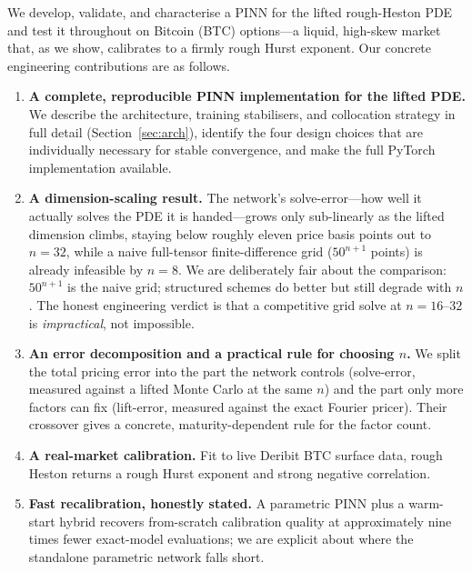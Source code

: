 \documentclass[review,12pt]{elsarticle}
\begin{document}
We develop, validate, and characterise a PINN for the lifted rough-Heston PDE and
test it throughout on Bitcoin (BTC) options---a liquid, high-skew market that, as
we show, calibrates to a firmly rough Hurst exponent.  Our concrete engineering
contributions are as follows.

\begin{enumerate}

\item \textbf{A complete, reproducible PINN implementation for the lifted PDE.}
We describe the architecture, training stabilisers, and collocation strategy in
full detail (Section~\ref{sec:arch}), identify the four design choices that are
individually necessary for stable convergence, and make the full PyTorch
implementation available.

\item \textbf{A dimension-scaling result.}  The network's solve-error---how well
it actually solves the PDE it is handed---grows only sub-linearly as the lifted
dimension climbs, staying below roughly eleven price basis points out to $n{=}32$,
while a naive full-tensor finite-difference grid ($50^{n+1}$ points) is already
infeasible by $n{=}8$.  We are deliberately fair about the comparison: $50^{n+1}$
is the naive grid; structured schemes do better but still degrade with $n$.  The
honest engineering verdict is that a competitive grid solve at $n{=}16$--$32$ is
\emph{impractical}, not impossible.

\item \textbf{An error decomposition and a practical rule for choosing $n$.}
We split the total pricing error into the part the network controls
(solve-error, measured against a lifted Monte Carlo at the same $n$) and the
part only more factors can fix (lift-error, measured against the exact Fourier
pricer).  Their crossover gives a concrete, maturity-dependent rule for the factor
count.

\item \textbf{A real-market calibration.}  Fit to live Deribit BTC surface data,
rough Heston returns a rough Hurst exponent and strong negative correlation.

\item \textbf{Fast recalibration, honestly stated.}  A parametric PINN plus a
warm-start hybrid recovers from-scratch calibration quality at approximately nine
times fewer exact-model evaluations; we are explicit about where the standalone
parametric network falls short.

\end{enumerate}
\end{document}
